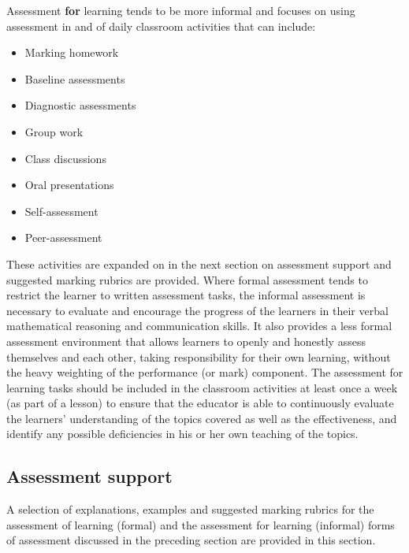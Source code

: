 Assessment \textbf{for} learning tends to be more informal and focuses on using assessment in and of daily classroom activities that can include: 
\begin{itemize}[noitemsep]
\item Marking homework
\item Baseline assessments
\item Diagnostic assessments
\item Group work
\item Class discussions
\item Oral presentations
\item Self-assessment
\item Peer-assessment
\end{itemize}
These activities are expanded on in the next section on assessment support and suggested marking rubrics are provided. Where formal assessment tends to restrict the learner to written assessment tasks, the informal assessment is necessary to evaluate and encourage the progress of the learners in their verbal mathematical reasoning and communication skills. It also provides a less formal assessment environment that allows learners to openly and honestly assess themselves and each other, taking responsibility for their own learning, without the heavy weighting of the performance (or mark) component. The assessment for learning tasks should be included in the classroom activities at least once a week (as part of a lesson) to ensure that the educator is able to continuously evaluate the learners’ understanding of the topics covered as well as the effectiveness, and identify any possible deficiencies in his or her own teaching of the topics. 

\subsection{Assessment support}
A selection of explanations, examples and suggested marking rubrics for the assessment of learning (formal) and the assessment for learning (informal) forms of assessment discussed in the preceding section are provided in this section. 
